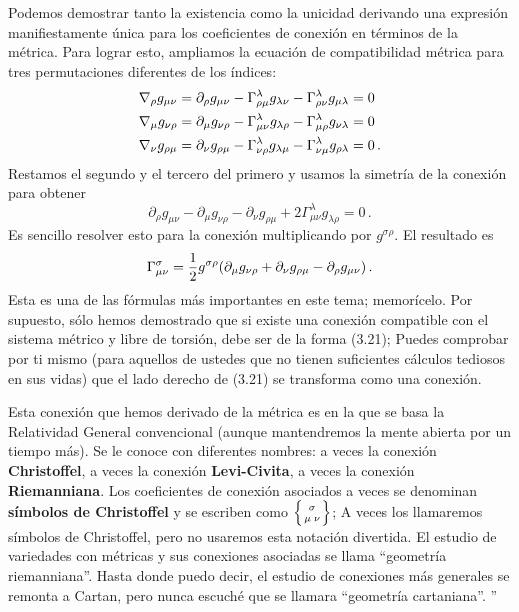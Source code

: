 \documentclass[11pt,b5paper,openany,twoside]{book}
\newcommand{\mn}{{\mu\nu}}
\newcommand{\p}[1]{{\partial_{#1}}}
\begin{document}
Podemos demostrar tanto la existencia como la unicidad derivando una expresión manifiestamente única para los coeficientes de conexión en términos de la métrica.
Para lograr esto, ampliamos la ecuación de compatibilidad métrica para tres permutaciones diferentes de los índices:
\begin{align}
\nabla_\rho g_\mn &=  \p\rho g_\mn - \Gamma^\lambda_{\rho\mu}
g_{\lambda\nu} - \Gamma^\lambda_{\rho\nu}g_{\mu\lambda} = 0 \notag \\
\nabla_\mu g_{\nu\rho} &=  \p\mu g_{\nu\rho} -\Gamma^\lambda_{\mu\nu}
g_{\lambda\rho} - \Gamma^\lambda_{\mu\rho}g_{\nu\lambda} = 0 \notag \\
\nabla_\nu g_{\rho\mu} &=  \p\nu g_{\rho\mu} -\Gamma^\lambda_{\nu\rho}
g_{\lambda\mu} - \Gamma^\lambda_{\nu\mu} g_{\rho\lambda} = 0\,.
\label{3.19}
\end{align}
Restamos el segundo y el tercero del primero y usamos la simetría de la conexión para obtener
\begin{equation}
\p\rho g_\mn - \p\mu g_{\nu\rho} - \p\nu g_{\rho\mu}
+2\Gamma^\lambda_\mn g_{\lambda\rho} = 0\,.\label{3.20}
\end{equation}
Es sencillo resolver esto para la conexión multiplicando por $g^{\sigma\rho}$.
El resultado es
\begin{equation}
\Gamma^\sigma_\mn = {1\over 2} g^{\sigma\rho}(\p\mu g_{\nu\rho} +
\p\nu g_{\rho\mu} - \p\rho g_\mn)\,.\label{3.21}
\end{equation}
Esta es una de las fórmulas más importantes en este tema; memorícelo.
Por supuesto, sólo hemos demostrado que si existe una conexión compatible con el sistema métrico y libre de torsión, debe ser de la forma (3.21); Puedes comprobar por ti mismo (para aquellos de ustedes que no tienen suficientes cálculos tediosos en sus vidas) que el lado derecho de (3.21) se transforma como una conexión.

Esta conexión que hemos derivado de la métrica es en la que se basa la Relatividad General convencional (aunque mantendremos la mente abierta por un tiempo más).
Se le conoce con diferentes nombres: a veces la conexión {\bf Christoffel}, a veces la conexión {\bf Levi-Civita}, a veces la conexión {\bf Riemanniana}.
Los coeficientes de conexión asociados a veces se denominan {\bf símbolos de Christoffel} y se escriben como $\left\{{\sigma \atop \mu\;\nu} \right\}$; A veces los llamaremos símbolos de Christoffel, pero no usaremos esta notación divertida.
El estudio de variedades con métricas y sus conexiones asociadas se llama ``geometría riemanniana''. Hasta donde puedo decir, el estudio de conexiones más generales se remonta a Cartan, pero nunca escuché que se llamara ``geometría cartaniana''. ''
\end{document}
